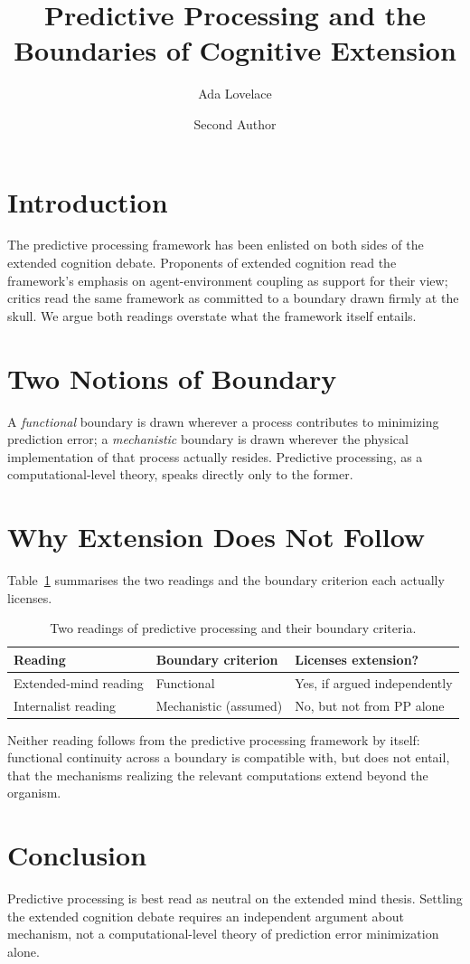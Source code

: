 \documentclass[stage=preparation]{phimisci}
\title{Predictive Processing and the Boundaries of Cognitive Extension}
\author{
  Ada Lovelace \affiliation{Institute of Analytical Engines, Berlin,
  Germany} \orcid{0000-0002-1825-0097}
  \and
  Second Author \affiliation{Department of Philosophy, Example
  University, USA}
}
\begin{document}
\maketitle

\section{Introduction}
The predictive processing framework has been enlisted on both sides of
the extended cognition debate. Proponents of extended cognition read the
framework's emphasis on agent-environment coupling as support for their
view; critics read the same framework as committed to a boundary drawn
firmly at the skull. We argue both readings overstate what the framework
itself entails.

\section{Two Notions of Boundary}
A \emph{functional} boundary is drawn wherever a process contributes to
minimizing prediction error; a \emph{mechanistic} boundary is drawn
wherever the physical implementation of that process actually resides.
Predictive processing, as a computational-level theory, speaks directly
only to the former.

\section{Why Extension Does Not Follow}
Table~\ref{tab:boundaries} summarises the two readings and the boundary
criterion each actually licenses.

\begin{table}[htb]
\centering
\caption{Two readings of predictive processing and their boundary
  criteria.}
\label{tab:boundaries}
\begin{tabular}{lll}
\toprule
Reading & Boundary criterion & Licenses extension? \\
\midrule
Extended-mind reading & Functional & Yes, if argued independently \\
Internalist reading   & Mechanistic (assumed) & No, but not from PP alone \\
\bottomrule
\end{tabular}
\end{table}

Neither reading follows from the predictive processing framework by
itself: functional continuity across a boundary is compatible with, but
does not entail, that the mechanisms realizing the relevant computations
extend beyond the organism.

\section{Conclusion}
Predictive processing is best read as neutral on the extended mind
thesis. Settling the extended cognition debate requires an independent
argument about mechanism, not a computational-level theory of prediction
error minimization alone.
\end{document}
